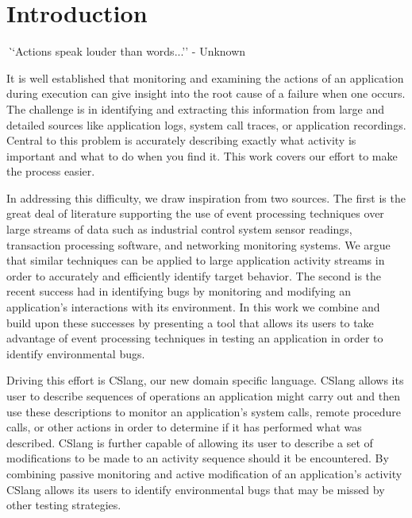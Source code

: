\section{Introduction}
\label{SEC:introduction}


{\textit ``Actions speak louder than words...'' - Unknown}

It is well established that monitoring and examining the actions of an
application during execution can give insight into the root cause of a failure
when one occurs.  The challenge is in identifying and extracting
this information from large and detailed sources like application logs,
system call traces, or application recordings.
Central to this problem
is accurately describing exactly what activity is important
and what to do when you find it.
This work covers our effort to make the process easier.

In addressing this difficulty,
we draw inspiration from two sources.
The first is the great deal of literature supporting the use of event
processing techniques over large streams of data such as
industrial control system sensor readings,
transaction processing software,
and networking monitoring systems.
We argue that similar techniques can be applied
to large application activity streams in order to accurately
and efficiently identify target behavior.
The second is the recent success had
in identifying bugs by monitoring
and modifying an application's interactions with its environment.
In this work we combine and build upon these successes by presenting a tool that
allows its users to take advantage of event processing techniques in testing
an application in order to identify environmental bugs.

Driving this effort is CSlang, our new domain specific language.
CSlang allows its user to describe sequences of operations an application
might carry out and
then use these descriptions
to monitor an application's system calls,
remote procedure calls,
or other actions in order to determine if it has
performed what was described.
CSlang is further capable of
allowing its user to describe a set of modifications
to be made to an activity sequence should it be encountered.
By combining passive monitoring and active modification of an application's
activity CSlang allows its users to identify environmental bugs that may
be missed by other testing strategies.

